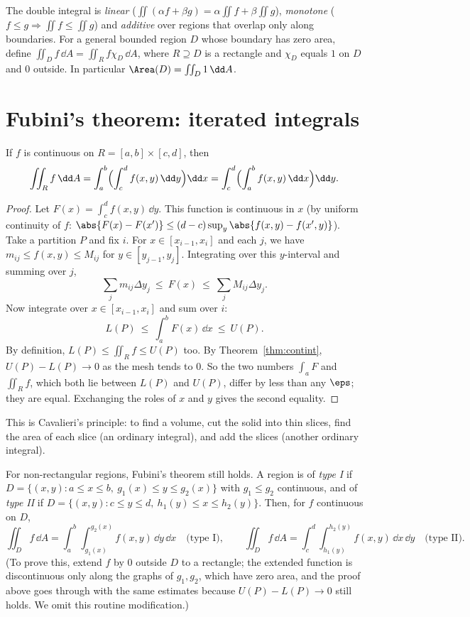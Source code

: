 The double integral is \emph{linear} ($\iint(\alpha f+\beta g)=\alpha\iint f+\beta\iint g$), \emph{monotone} ($f\le g\Rightarrow\iint f\le\iint g$) and \emph{additive} over regions that overlap only along boundaries. For a general bounded region $D$ whose boundary has zero area, define $\iint_Df\,\dd A=\iint_Rf\chi_D\,\dd A$, where $R\supseteq D$ is a rectangle and $\chi_D$ equals $1$ on $D$ and $0$ outside. In particular $\Area(D)=\iint_D1\,\dd A$.

\section{Fubini's theorem: iterated integrals}

\begin{theorem}\label{thm:fubini}
If $f$ is continuous on $R=[a,b]\times[c,d]$, then
\[
\iint_Rf\,\dd A=\int_a^b\Bigl(\int_c^df(x,y)\,\dd y\Bigr)\dd x=\int_c^d\Bigl(\int_a^bf(x,y)\,\dd x\Bigr)\dd y .
\]
\end{theorem}

\begin{proof}
Let $F(x)=\int_c^df(x,y)\,\dd y$. This function is continuous in $x$ (by uniform continuity of $f$: $\abs{F(x)-F(x')}\le(d-c)\sup_y\abs{f(x,y)-f(x',y)}$). Take a partition $P$ and fix $i$. For $x\in[x_{i-1},x_i]$ and each $j$, we have $m_{ij}\le f(x,y)\le M_{ij}$ for $y\in[y_{j-1},y_j]$. Integrating over this $y$-interval and summing over $j$,
\[
\sum_jm_{ij}\Delta y_j\ \le\ F(x)\ \le\ \sum_jM_{ij}\Delta y_j .
\]
Now integrate over $x\in[x_{i-1},x_i]$ and sum over $i$:
\[
L(P)\ \le\ \int_a^bF(x)\,\dd x\ \le\ U(P).
\]
By definition, $L(P)\le\iint_Rf\le U(P)$ too. By Theorem~\ref{thm:contint}, $U(P)-L(P)\to0$ as the mesh tends to $0$. So the two numbers $\int_aF$ and $\iint_Rf$, which both lie between $L(P)$ and $U(P)$, differ by less than any $\eps$; they are equal. Exchanging the roles of $x$ and $y$ gives the second equality.
\end{proof}

\begin{intuition}
This is Cavalieri's principle: to find a volume, cut the solid into thin slices, find the area of each slice (an ordinary integral), and add the slices (another ordinary integral).
\end{intuition}

For non-rectangular regions, Fubini's theorem still holds. A region is of \emph{type I} if $D=\{(x,y):a\le x\le b,\ g_1(x)\le y\le g_2(x)\}$ with $g_1\le g_2$ continuous, and of \emph{type II} if $D=\{(x,y):c\le y\le d,\ h_1(y)\le x\le h_2(y)\}$. Then, for $f$ continuous on $D$,
\[
\iint_Df\,\dd A=\int_a^b\!\int_{g_1(x)}^{g_2(x)}f(x,y)\,\dd y\,\dd x\quad\text{(type I)},\qquad
\iint_Df\,\dd A=\int_c^d\!\int_{h_1(y)}^{h_2(y)}f(x,y)\,\dd x\,\dd y\quad\text{(type II)}.
\]
(To prove this, extend $f$ by $0$ outside $D$ to a rectangle; the extended function is discontinuous only along the graphs of $g_1,g_2$, which have zero area, and the proof above goes through with the same estimates because $U(P)-L(P)\to0$ still holds. We omit this routine modification.)

